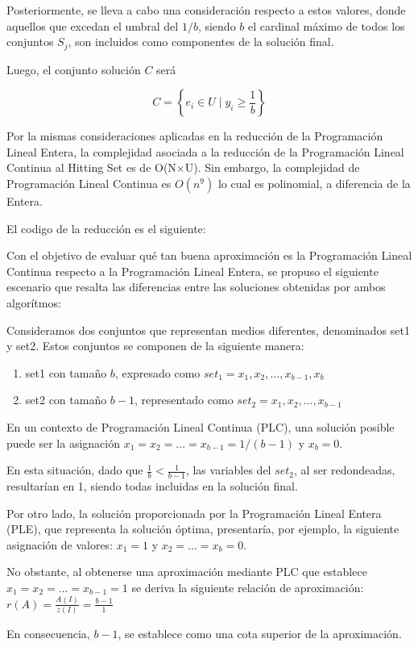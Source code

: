Posteriormente, se lleva a cabo una consideración respecto a estos valores, donde aquellos que excedan el umbral del $1/b$, siendo $b$ el cardinal máximo de todos los conjuntos $S_j$, son incluidos como componentes de la solución final.

Luego, el conjunto solución $C$ será

\[
    C = \left\{e_i \in U \mid y_{i} \geq \frac{1}{b}\right\}
\]

Por la mismas consideraciones aplicadas en la reducción de la Programación Lineal Entera, la complejidad asociada a la reducción de la Programación Lineal Continua al Hitting Set es de O(N×U).
Sin embargo, la complejidad de Programación Lineal Continua es $O(n^9)$ lo cual es polinomial, a diferencia de la Entera. 

El codigo de la reducción es el siguiente:



Con el objetivo de evaluar qué tan buena aproximación es la Programación Lineal Continua respecto a la Programación Lineal Entera, se propuso el siguiente escenario que resalta las diferencias entre las soluciones obtenidas por ambos algorítmos:

Consideramos dos conjuntos que representan medios diferentes, denominados set1 y set2. Estos conjuntos se componen de la siguiente manera:
\begin{enumerate}
    \item set1 con tamaño $b$, expresado como $set_1={x_1, x_2, ..., x_{b-1},  x_b}$
    \item set2 con tamaño $b-1$, representado como $set_2={x_1, x_2, ..., x_{b-1}}$
\end{enumerate}

En un contexto de Programación Lineal Continua (PLC), una solución posible puede ser la asignación $x_1 = x_2 = ... = x_{b-1} = 1/(b-1)$ y $x_b=0$.

En esta situación, dado que $\frac{1}{b} < \frac{1}{b-1}$, las variables del $set_2$, al ser redondeadas, resultarían en 1, siendo todas incluidas en la solución final.

Por otro lado, la solución proporcionada por la Programación Lineal Entera (PLE), que representa la solución óptima, presentaría, por ejemplo, la siguiente asignación de valores:  $x_1 = 1$ y  $x_2 = ... = x_{b} = 0$. 

No obstante, al obtenerse una aproximación mediante PLC que establece $x_1 = x_2 = ... = x_{b-1} = 1$ se deriva la siguiente relación de aproximación: $r(A)=\frac{A(I)}{z(I)}=\frac{b-1}{1}$

En consecuencia, $b-1$, se establece como una cota superior de la aproximación. 

